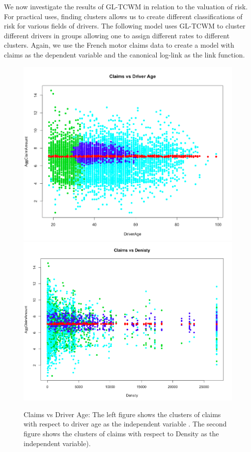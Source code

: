 \documentclass[11pt,letterpaper]{article}
\numberwithin{equation}{section}
\numberwithin{equation}{section}
\numberwithin{equation}{section}
\begin{document}
	We now investigate the results of GL-TCWM in relation to the valuation of risk. For practical uses, finding clusters allows us to create different classifications of risk for various fields of drivers. The following model uses GL-TCWM to cluster different drivers in groups allowing one to assign different rates to different clusters. Again, we use the French motor claims data to create a model with claims as the dependent variable and the canonical log-link as the link function. 
\begin{figure}[!htb]
\begin{center}
\includegraphics[scale=0.24]{clms.png}
\includegraphics[scale=0.24]{dens.png}
\end{center}
\caption{Claims vs Driver Age: The left figure shows the clusters of claims with respect to driver age as the independent variable . The second figure shows the clusters of claims with respect to Density as the independent variable).}
\label{fig:vet1}
\end{figure}
\end{document}
